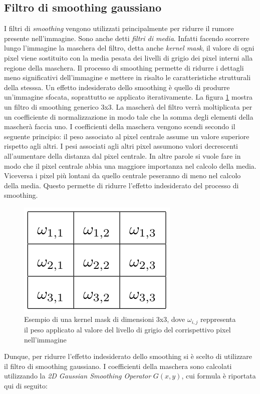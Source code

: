 \subsection{Filtro di smoothing gaussiano}
I filtri di \emph{smoothing} vengono utilizzati principalmente per ridurre il rumore presente nell'immagine. Sono anche detti \emph{filtri di media}. Infatti facendo scorrere lungo l'immagine la maschera del filtro, detta anche \emph{kernel mask}, il valore di ogni pixel viene sostituito con la media pesata dei livelli di grigio dei pixel interni alla regione della maschera. Il processo di smoothing permette di ridurre i dettagli meno significativi dell'immagine e mettere in risalto le caratteristiche strutturali della stesssa.
Un effetto indesiderato dello smoothing è quello di produrre un'immagine sfocata, soprattutto se applicato iterativamente.
La figura \ref{fig:kernelMask} mostra un filtro di smoothing generico 3x3. La mascherà del filtro verrà moltiplicata per un coefficiente di normalizzazione in modo tale che la somma degli elementi della mascherà faccia uno. I coefficienti della maschera vengono scendi secondo il seguente principio: il peso associato al pixel centrale assume un valore superiore rispetto agli altri. I pesi associati agli altri pixel assumono valori decrescenti all'aumentare della distanza dal pixel centrale. In altre parole si vuole fare in modo che il pixel centrale abbia una maggiore importanza nel calcolo della media. Viceversa i pixel più lontani da quello centrale peseranno di meno nel calcolo della media. Questo permette di ridurre l'effetto indesiderato del processo di smoothing.

\begin{figure}[ht]
\begin{center}
\includegraphics[width=.3\textwidth]{img/kernel_mask}
\caption{ Esempio di una kernel mask di dimensioni 3x3, dove $\omega_{i,j}$ reppresenta il peso applicato al valore del livello di grigio del corrispettivo pixel nell'immagine}
\label{fig:kernelMask}
\end{center}
\end{figure}

Dunque, per ridurre l'effetto indesiderato dello smoothing si è scelto di utilizzare il filtro di smoothing gaussiano. I coefficienti della maschera sono calcolati utilizzando la \emph{2D Gaussian Smoothing Operator} $G(x,y)$, cui formula è riportata qui di seguito:

